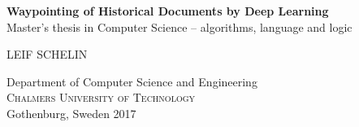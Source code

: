 
\begin{titlepage}
			
\addtolength{\voffset}{2cm}



\mbox{}
\vfill
\renewcommand{\familydefault}{\sfdefault} \normalfont %
\textbf{{\Huge 	Waypointing of Historical Documents by Deep Learning%
				}} 	\\[0.5cm]
Master's thesis in Computer Science -- algorithms, language and logic \setlength{\parskip}{1cm}

{\Large LEIF SCHELIN} \setlength{\parskip}{2.9cm}

Department of Computer Science and Engineering \\
\textsc{Chalmers University of Technology} \\
Gothenburg, Sweden 2017

\renewcommand{\familydefault}{\rmdefault} \normalfont %
\end{titlepage}


\newpage
\restoregeometry
\thispagestyle{empty}
\mbox{}


